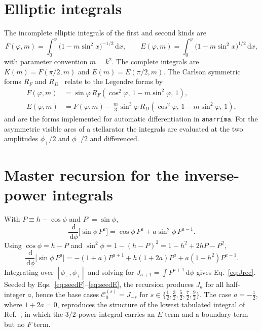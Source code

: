 \documentclass[11pt]{article}
\newcommand{\dd}{\,\mathrm{d}}
\newcommand{\Ck}[2]{\mathcal{C}^{(#2)}_{#1}}
\newcommand{\Ja}[1]{J_{#1}}
\newcommand{\Fell}{F}
\newcommand{\Eell}{E}
\begin{document}
\appendix

\section{Elliptic integrals}
\label{app:elliptic}

The incomplete elliptic integrals of the first and second kinds are
\begin{equation}
\Fell(\varphi,m)=\int_0^{\varphi}\big(1-m\sin^2 x\big)^{-1/2}\dd x,\qquad
\Eell(\varphi,m)=\int_0^{\varphi}\big(1-m\sin^2 x\big)^{1/2}\dd x,
\end{equation}
with parameter convention $m=k^2$. The complete integrals are $K(m)=\Fell(\pi/2,m)$ and $E(m)=\Eell(\pi/2,m)$. The Carlson symmetric forms $R_F$ and $R_D$~\cite{carlson1979,carlson1995} relate to the Legendre forms by
\begin{align}
\Fell(\varphi,m)&=\sin\varphi\,R_F(\cos^2\varphi,\,1-m\sin^2\varphi,\,1),\\
\Eell(\varphi,m)&=\Fell(\varphi,m)-\tfrac{m}{3}\sin^3\varphi\,R_D(\cos^2\varphi,\,1-m\sin^2\varphi,\,1),
\end{align}
and are the forms implemented for automatic differentiation in \texttt{anarr\'ima}. For the asymmetric visible arcs of a stellarator the integrals are evaluated at the two amplitudes $\phi_+/2$ and $\phi_-/2$ and differenced.

\section{Master recursion for the inverse-power integrals}
\label{app:master}

With $P\equiv h-\cos\phi$ and $P'=\sin\phi$,
\begin{equation}
\frac{\dd}{\dd\phi}\big[\sin\phi\,P^{a}\big]
=\cos\phi\,P^{a}+a\sin^2\phi\,P^{a-1}.
\end{equation}
Using $\cos\phi=h-P$ and $\sin^2\phi=1-(h-P)^2=1-h^2+2hP-P^2$,
\begin{equation}
\frac{\dd}{\dd\phi}\big[\sin\phi\,P^{a}\big]
=-(1+a)P^{a+1}+h(1+2a)P^{a}+a(1-h^2)P^{a-1}.
\end{equation}
Integrating over $[\phi_-,\phi_+]$ and solving for $\Ja{a+1}=\int P^{a+1}\dd\phi$ gives Eq.~\eqref{eq:Jrec}. Seeded by Eqs.~\eqref{eq:seedF}--\eqref{eq:seedE}, the recursion produces $\Ja{a}$ for all half-integer $a$, hence the base cases $\Ck{0}{s}=\Ja{-s}$ for $s\in\{\tfrac12,\tfrac32,\tfrac52,\tfrac72,\tfrac92\}$. The case $a=-\tfrac12$, where $1+2a=0$, reproduces the structure of the lowest tabulated integral of Ref.~\cite{schwartz2025}, in which the $3/2$-power integral carries an $E$ term and a boundary term but no $F$ term.
\end{document}
